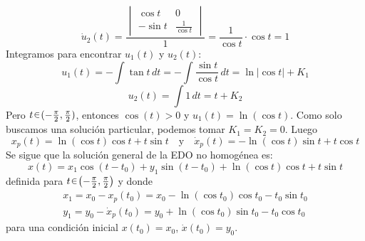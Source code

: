 \begin{sol}
\[\]
\[
\dot{u}_2(t) = \frac{\begin{vmatrix}
\cos t & 0 \\
-\sin t & \frac{1}{\cos t}
\end{vmatrix}}{1} = \frac{1}{\cos t} \cdot \cos t = 1
\]
Integramos para encontrar $u_1(t)$ y $u_2(t)$:
\[
u_1(t) = -\int \tan t \, dt = -\int \frac{\sin t}{\cos t} \, dt = \ln|\cos t| + K_1
\]
\[
u_2(t) = \int 1 \, dt = t + K_2
\]
Pero $t \en (-\frac\pi2, \frac\pi2)$, entonces $\cos(t)>0$ y $u_1(t) = \ln(\cos t)$. Como solo buscamos una solución particular, podemos tomar $K_1 = K_2 = 0$. Luego
\[
x_p(t) = \ln(\cos t)\cos t + t\sin t%
\quad\text{y}\quad%
\dot{x}_p(t) = -\ln(\cos t)\sin t + t\cos t
\]
Se sigue que la solución general de la EDO no homogénea es:
\[
x(t) = x_1 \cos(t-t_0) + y_1 \sin(t-t_0) + \ln(\cos t)\cos t + t \sin t
\]
definida para $t \en \left(-\tfrac{\pi}{2}, \tfrac{\pi}{2}\right)$ y donde 
\begin{align*}
x_1 = x_0 - x_p(t_0) = x_0 - \ln(\cos t_0)\cos t_0 - t_0 \sin t_0\\
y_1 = y_0 - \dot{x}_p(t_0) = y_0 + \ln(\cos t_0)\sin t_0 - t_0\cos t_0  
\end{align*}
para una condición inicial $x(t_0) = x_0$, $\dot{x}(t_0) = y_0$.
\end{sol}

